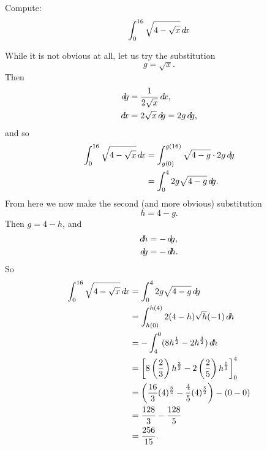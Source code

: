 \documentclass{ximera}
\begin{document}
\begin{example}
Compute:
\[
\int_0^{16} \sqrt{4 - \sqrt{x}} \mathop{}\!d\! x
\]
\begin{explanation}
While it is not obvious at all, let us try the substitution
\[
g = \sqrt{x}.
\]
Then
\begin{align*}
\d g &= \frac{1}{2 \sqrt{x}} \d x,\\
\d x &= 2 \sqrt{x} \d g = 2g \d g,
\end{align*}
and so
\begin{align*}
\int_0^{16} \sqrt{4 - \sqrt{x}} \mathop{}\!d\! x &= \int_{g(0)}^{g(16)} \sqrt{4-g} \cdot 2g \mathop{}\!d\! g  \\
&= \int_0^4 2g \sqrt{4-g} \mathop{}\!d\! g.
\end{align*}
From here we now make the second (and more obvious) substitution
\[
h = 4-g.
\]
Then $g = 4-h$, and
\begin{align*}
\d h &= - \d g,\\
\d g &= - \d h.
\end{align*}
So
\begin{align*}
\int_0^{16} \sqrt{4 - \sqrt{x}} \d x &= \int_0^4 2g \sqrt{4-g} \d g  \\
&= \int_{h(0)}^{h(4)} 2 (4-h) \sqrt{h} (-1) \d h  \\
&= - \int_4^0 ( 8h^{\frac{1}{2}} - 2h^{\frac{3}{2}} ) \d h  \\
&= \eval{ 8 \left( \frac{2}{3} \right) h^{\frac{3}{2}} - 2 \left( \frac{2}{5} \right) h^{\frac{5}{2}} }_{0}^{4}  \\
&= \left( \frac{16}{3} (4)^{\frac{3}{2}} - \frac{4}{5} (4)^{\frac{5}{2}} \right) - \left( 0 - 0 \right)  \\
&= \frac{128}{3} - \frac{128}{5}   \\
&= \frac{256}{15}.
\end{align*}
\end{explanation}
\end{example}
\end{document}
